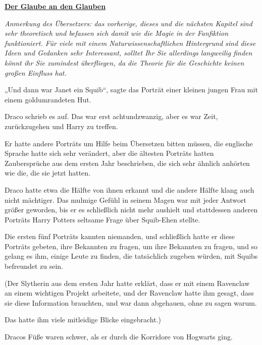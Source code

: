

\hypertarget{der-glaube-an-den-glauben}{%

\textbf{\uline{Der Glaube an den Glauben}}

\emph{Anmerkung des Übersetzers: das vorherige, dieses und die nächsten Kapitel sind sehr theoretisch und befassen sich damit wie die Magie in der Fanfiktion funktioniert. Für viele mit einem Naturwissenschaftlichen Hintergrund sind diese Ideen und Gedanken sehr Interessant, solltet Ihr Sie allerdings langweilig finden könnt ihr Sie zumindest überfliegen, da die Theorie für die Geschichte keinen großen Einfluss hat.}

„Und dann war Janet ein Squib“, sagte das Porträt einer kleinen jungen Frau mit einem goldumrandeten Hut.

Draco schrieb es auf. Das war erst achtundzwanzig, aber es war Zeit, zurückzugehen und Harry zu treffen.

Er hatte andere Porträts um Hilfe beim Übersetzen bitten müssen, die englische Sprache hatte sich sehr verändert, aber die ältesten Porträts hatten Zaubersprüche aus dem ersten Jahr beschrieben, die sich sehr ähnlich anhörten wie die, die sie jetzt hatten.

Draco hatte etwa die Hälfte von ihnen erkannt und die andere Hälfte klang auch nicht mächtiger. Das mulmige Gefühl in seinem Magen war mit jeder Antwort größer geworden, bis er es schließlich nicht mehr aushielt und stattdessen anderen Porträts Harry Potters seltsame Frage über Squib-Ehen stellte.

Die ersten fünf Porträts kannten niemanden, und schließlich hatte er diese Porträts gebeten, ihre Bekannten zu fragen, um ihre Bekannten zu fragen, und so gelang es ihm, einige Leute zu finden, die tatsächlich zugeben würden, mit Squibs befreundet zu sein.

(Der Slytherin aus dem ersten Jahr hatte erklärt, dass er mit einem Ravenclaw an einem wichtigen Projekt arbeitete, und der Ravenclaw hatte ihm gesagt, dass sie diese Information brauchten, und war dann abgehauen, ohne zu sagen warum.

Das hatte ihm viele mitleidige Blicke eingebracht.)

Dracos Füße waren schwer, als er durch die Korridore von Hogwarts ging.

}
